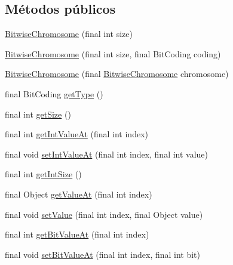 \subsection*{Métodos públicos}
\begin{DoxyCompactItemize}
\item 
\hyperlink{classjenes_1_1chromosome_1_1_bitwise_chromosome_a87547c87419943bded51820cbc1ae830}{Bitwise\-Chromosome} (final int size)
\item 
\hyperlink{classjenes_1_1chromosome_1_1_bitwise_chromosome_a9109a8205e447db9032f29494f0d9b3d}{Bitwise\-Chromosome} (final int size, final Bit\-Coding coding)
\item 
\hyperlink{classjenes_1_1chromosome_1_1_bitwise_chromosome_a90798d86b6c1871c441b562e0b1d50ca}{Bitwise\-Chromosome} (final \hyperlink{classjenes_1_1chromosome_1_1_bitwise_chromosome}{Bitwise\-Chromosome} chromosome)
\item 
final Bit\-Coding \hyperlink{classjenes_1_1chromosome_1_1_bitwise_chromosome_a905b92cd6dc14db9d2b9276f1a6686e9}{get\-Type} ()
\item 
final int \hyperlink{classjenes_1_1chromosome_1_1_bitwise_chromosome_ae59ae8f495ec9d5aa15712cee7c0b313}{get\-Size} ()
\item 
final int \hyperlink{classjenes_1_1chromosome_1_1_bitwise_chromosome_af817cb2110fc6b8d415e46377ddd4911}{get\-Int\-Value\-At} (final int index)
\item 
final void \hyperlink{classjenes_1_1chromosome_1_1_bitwise_chromosome_a3cbcf428333a0dc4209ce2c820054542}{set\-Int\-Value\-At} (final int index, final int value)
\item 
final int \hyperlink{classjenes_1_1chromosome_1_1_bitwise_chromosome_a36e6b8c849d563a359245763116667d5}{get\-Int\-Size} ()
\item 
final Object \hyperlink{classjenes_1_1chromosome_1_1_bitwise_chromosome_a3061d34e1f0c0faa915d4da7ea2f615c}{get\-Value\-At} (final int index)
\item 
final void \hyperlink{classjenes_1_1chromosome_1_1_bitwise_chromosome_aaa42be8f0c26735e8a8d603d9b743b6a}{set\-Value} (final int index, final Object value)
\item 
final int \hyperlink{classjenes_1_1chromosome_1_1_bitwise_chromosome_a05ce80f3729d007c5d550eef5969ac86}{get\-Bit\-Value\-At} (final int index)
\item 
final void \hyperlink{classjenes_1_1chromosome_1_1_bitwise_chromosome_a2e746b511933914d4be452573ac5ab7c}{set\-Bit\-Value\-At} (final int index, final int bit)
\item 

\end{DoxyCompactItemize}
